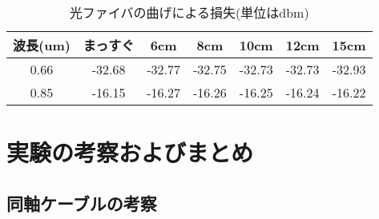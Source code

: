 \documentclass[a4paper,11pt,xelatex,ja=standard]{bxjsarticle}
\begin{document}
            \begin{center}
                \begin{table}[H]
                    \caption{光ファイバの曲げによる損失(単位はdbm)}
                    \centering
                \begin{tabular}{|c|c|c|c|c|c|c|}
                    \hline
                    波長(um) & まっすぐ & 6cm & 8cm & 10cm & 12cm & 15cm \\
                    \hline
                    0.66 & -32.68 & -32.77 & -32.75 & -32.73 & -32.73 & -32.93 \\
                    \hline
                    0.85 & -16.15 & -16.27 & -16.26 & -16.25 & -16.24 & -16.22 \\
                    \hline
                \end{tabular}
                \end{table}
            \end{center}
            

\section{実験の考察およびまとめ}

\subsection{同軸ケーブルの考察}
\end{document}

